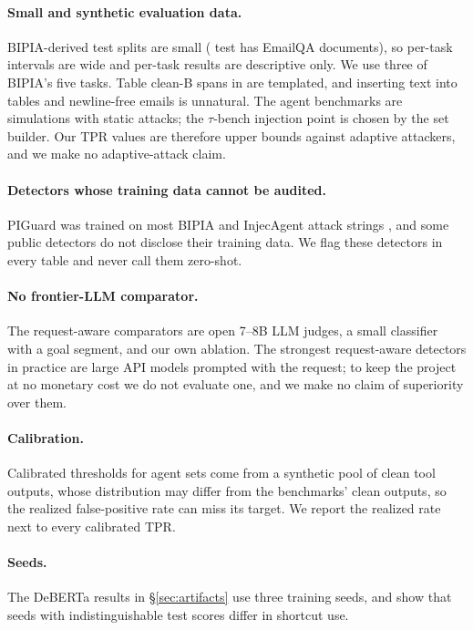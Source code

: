 \paragraph{Small and synthetic evaluation data.}
BIPIA-derived test splits are small (\vtwo{} test has  EmailQA documents), so per-task
intervals are wide and per-task results are descriptive only. We use three of BIPIA's five tasks. Table clean-B
spans in \vthree{} are templated, and inserting text into tables and newline-free emails is unnatural. The agent
benchmarks are simulations with static attacks; the $\tau$-bench injection point is chosen by the set builder. Our
TPR values are therefore upper bounds against adaptive attackers, and we make no adaptive-attack claim.

\paragraph{Detectors whose training data cannot be audited.}
PIGuard was trained on most BIPIA and InjecAgent attack strings \citep{liu2026passing}, and some public detectors do
not disclose their training data. We flag these detectors in every table and never call them zero-shot.

\paragraph{No frontier-LLM comparator.}
The request-aware comparators are open 7--8B LLM judges, a small classifier with a goal segment, and our own
ablation. The strongest request-aware detectors in practice are large API models prompted with the request; to keep
the project at no monetary cost we do not evaluate one, and we make no claim of superiority over them.

\paragraph{Calibration.}
Calibrated thresholds for agent sets come from a synthetic pool of clean tool outputs, whose distribution may differ
from the benchmarks' clean outputs, so the realized false-positive rate can miss its target. We report the realized
rate next to every calibrated TPR.

\paragraph{Seeds.}
The \vtwo{} DeBERTa results in \S\ref{sec:artifacts} use three training seeds, and show that seeds with
indistinguishable test scores differ in shortcut use. 
